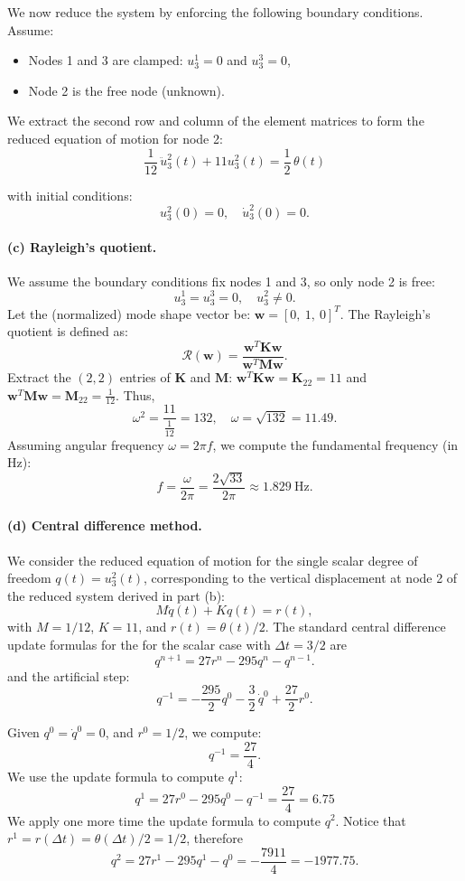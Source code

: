 \documentclass[12pt]{article}
\begin{document}
We now reduce the system by enforcing the following boundary conditions. Assume:
\begin{itemize}
	\item Nodes 1 and 3 are clamped: \( u_3^1 = 0 \) and \( u_3^3 = 0 \),
	\item Node 2 is the free node (unknown).
\end{itemize}
We extract the second row and column of the element matrices to form the reduced equation of motion for node 2:
\[
	\frac{1}{12} \, \ddot{u}_3^2(t) + 11u_3^2(t) = \frac{1}{2} \, \theta(t)
\]

with initial conditions:
\[
	u_3^2(0) = 0, \quad \dot{u}_3^2(0) = 0.
\]
\paragraph*{(c) Rayleigh's quotient.} We assume the boundary conditions fix nodes 1 and 3, so only node 2 is free:
\[
	u_3^1 = u_3^3 = 0, \quad u_3^2 \neq 0.
\]
Let the (normalized) mode shape vector be: $\mathbf{w} =[0,\ 1,\ 0]^T$. The Rayleigh's quotient is defined as:
\[
	\mathcal R(\mathbf w) = \frac{\mathbf{w}^T \mathbf{K} \mathbf{w}}{\mathbf{w}^T \mathbf{M} \mathbf{w}}.
\]
Extract the \( (2,2) \) entries of \( \mathbf{K} \) and \( \mathbf{M} \): $\mathbf{w}^T \mathbf{K} \mathbf{w} = \mathbf K_{22} = 11$ and $\mathbf{w}^T \mathbf{M} \mathbf{w} = \mathbf M_{22} = \frac{1}{12}$. Thus,
\[
	\omega^2 = \frac{11}{\frac{1}{12}} = 132, \quad \omega = \sqrt{132} = 11.49.
\]
Assuming angular frequency \( \omega = 2\pi f \), we compute the fundamental frequency (in Hz):
\[
	f = \frac{\omega}{2\pi} = \frac{2\sqrt{33}}{2\pi}\approx 1.829 \ \text{Hz}.
\]


\paragraph*{(d) Central difference method.}

We consider the reduced equation of motion for the single scalar degree of freedom \( q(t)=u^2_3(t) \), corresponding to the vertical displacement at node 2 of the reduced system derived in part (b):
\[
	M \ddot{q}(t) + K q(t) = r(t),
\]
with $M = 1/12$, $K = 11$, and $r(t) = \theta(t)/2$. The standard central difference update formulas for the for the scalar case with $\Delta t = 3/2$ are
\[
	{q}^{n+1} = 27{r}^n - 295 {q}^n - {q}^{n-1}.
\]
and the artificial step:
\[
	{q}^{-1} = -\frac{295}{2}{q}^0 - \frac{3}{2} \, \dot{q}^0 + \frac{27}{2}{r}^0.
\]

Given $q^0 = \dot{q}^0 = 0$, and $r^0 = 1/2$, we compute:
\[
	q^{-1} = \frac{27}{4}.
\]
We use the update formula to compute $q^1$:
\[
	q^1 = 27r^0 -295q^0 - q^{-1} = \frac{27}{4} = 6.75
\]
We apply one more time the update formula to compute $q^2$. Notice that $r^1=r(\Delta t)=\theta(\Delta t)/2=1/2$, therefore
\[
	q^2 = 27r^1 -295q^1 - q^{0} = -\frac{7911}{4} = -1977.75.
\]
\end{document}
